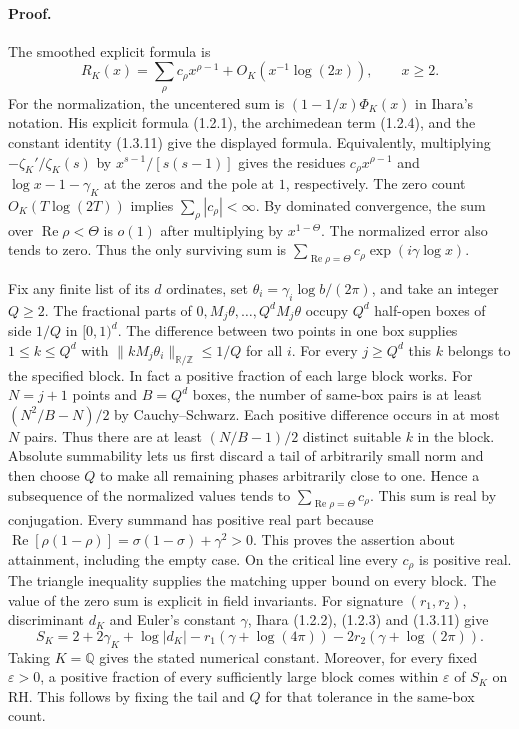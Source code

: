 \paragraph{Proof.}
The smoothed explicit formula is
\[
 R_K(x)=\sum_\rho c_\rho x^{\rho-1}
       +O_K(x^{-1}\log(2x)),\qquad x\ge2 .
\]
For the normalization, the uncentered sum is $(1-1/x)\Phi_K(x)$
in Ihara's notation. His explicit formula (1.2.1), the archimedean
term (1.2.4), and the constant identity (1.3.11) give the displayed
formula. Equivalently, multiplying $-\zeta_K'/\zeta_K(s)$ by
$x^{s-1}/[s(s-1)]$ gives the residues $c_\rho x^{\rho-1}$
and $\log x-1-\gamma_K$ at the zeros and the pole at $1$,
respectively. The zero count $O_K(T\log(2T))$ implies
$\sum_\rho|c_\rho|<\infty$.
By dominated convergence, the sum over $\operatorname{Re}\rho<\Theta$
is $o(1)$ after multiplying by $x^{1-\Theta}$. The normalized
error also tends to zero. Thus the only surviving sum is
$\sum_{\operatorname{Re}\rho=\Theta}c_\rho
\exp(i\gamma\log x)$.

Fix any finite list of its $d$ ordinates, set
$\theta_i=\gamma_i\log b/(2\pi)$, and take an integer $Q\ge2$.
The fractional parts of $0,M_j\theta,\ldots,Q^dM_j\theta$ occupy
$Q^d$ half-open boxes of side $1/Q$ in $[0,1)^d$. The difference between
two points in one box supplies $1\le k\le Q^d$ with
$\|kM_j\theta_i\|_{\mathbb R/\mathbb Z}\le1/Q$ for all $i$.
For every $j\ge Q^d$ this $k$ belongs to the specified block.
In fact a positive fraction of each large block works. For $N=j+1$
points and $B=Q^d$ boxes, the number of same-box pairs is at least
$(N^2/B-N)/2$ by Cauchy--Schwarz. Each positive difference occurs
in at most $N$ pairs. Thus there are at least $(N/B-1)/2$ distinct
suitable $k$ in the block.
Absolute summability lets us first discard a tail of arbitrarily
small norm and then choose $Q$ to make all remaining phases arbitrarily
close to one. Hence a subsequence of the normalized values tends to
$\sum_{\operatorname{Re}\rho=\Theta}c_\rho$. This sum is real by
conjugation. Every summand has positive real part because
$\operatorname{Re}[\rho(1-\rho)]=\sigma(1-\sigma)+\gamma^2>0$.
This proves the assertion about attainment, including the empty case.
On the critical line every $c_\rho$ is positive real. The triangle
inequality supplies the matching upper bound on every block. The
value of the zero sum is explicit in field invariants. For signature
$(r_1,r_2)$, discriminant $d_K$ and Euler's constant $\gamma$,
Ihara (1.2.2), (1.2.3) and (1.3.11) give
\[
 S_K=2+2\gamma_K+\log|d_K|-r_1(\gamma+\log(4\pi))
                    -2r_2(\gamma+\log(2\pi)).
\]
Taking $K=\mathbb Q$ gives the stated numerical constant. Moreover,
for every fixed $\varepsilon>0$, a positive fraction of every sufficiently
large block comes within $\varepsilon$ of $S_K$ on RH. This follows by
fixing the tail and $Q$ for that tolerance in the same-box count.


